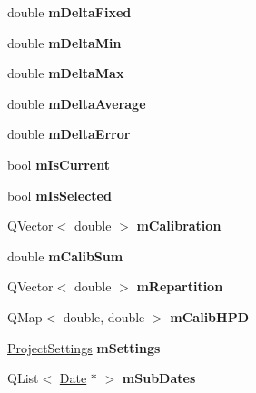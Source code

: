 \begin{DoxyCompactItemize}
\item 
\hypertarget{class_date_a99d906fa26cf5e172c82f89cafbb5d29}{double {\bfseries m\-Delta\-Fixed}}\label{class_date_a99d906fa26cf5e172c82f89cafbb5d29}

\item 
\hypertarget{class_date_a49a1e11b0c11e08d5d31c779b4e4162c}{double {\bfseries m\-Delta\-Min}}\label{class_date_a49a1e11b0c11e08d5d31c779b4e4162c}

\item 
\hypertarget{class_date_a1860b01d6c38f622045c75a5c59da380}{double {\bfseries m\-Delta\-Max}}\label{class_date_a1860b01d6c38f622045c75a5c59da380}

\item 
\hypertarget{class_date_a54304fe7c70631b1c0ab1ddedf29140c}{double {\bfseries m\-Delta\-Average}}\label{class_date_a54304fe7c70631b1c0ab1ddedf29140c}

\item 
\hypertarget{class_date_ae655564ea209648c17f53d53586874d5}{double {\bfseries m\-Delta\-Error}}\label{class_date_ae655564ea209648c17f53d53586874d5}

\item 
\hypertarget{class_date_ad8e7e873fbc2513bb2a0d194c6a81f53}{bool {\bfseries m\-Is\-Current}}\label{class_date_ad8e7e873fbc2513bb2a0d194c6a81f53}

\item 
\hypertarget{class_date_abb33769a8f026dc32afb761016731156}{bool {\bfseries m\-Is\-Selected}}\label{class_date_abb33769a8f026dc32afb761016731156}

\item 
\hypertarget{class_date_aab78b5a4ce115739349ea549d41d4e64}{Q\-Vector$<$ double $>$ {\bfseries m\-Calibration}}\label{class_date_aab78b5a4ce115739349ea549d41d4e64}

\item 
\hypertarget{class_date_a379410c8404820b4f78b1c3cfb590c57}{double {\bfseries m\-Calib\-Sum}}\label{class_date_a379410c8404820b4f78b1c3cfb590c57}

\item 
\hypertarget{class_date_a3a721128a81405055fbc41c7cfc8371f}{Q\-Vector$<$ double $>$ {\bfseries m\-Repartition}}\label{class_date_a3a721128a81405055fbc41c7cfc8371f}

\item 
\hypertarget{class_date_ad35aa6c168924fafededb2f97533c714}{Q\-Map$<$ double, double $>$ {\bfseries m\-Calib\-H\-P\-D}}\label{class_date_ad35aa6c168924fafededb2f97533c714}

\item 
\hypertarget{class_date_a32da7646da4c2e972a51d2370cea8832}{\hyperlink{class_project_settings}{Project\-Settings} {\bfseries m\-Settings}}\label{class_date_a32da7646da4c2e972a51d2370cea8832}

\item 
\hypertarget{class_date_a62ee2e82b70da0bb34a0f75156785dfe}{Q\-List$<$ \hyperlink{class_date}{Date} $\ast$ $>$ {\bfseries m\-Sub\-Dates}}\label{class_date_a62ee2e82b70da0bb34a0f75156785dfe}

\end{DoxyCompactItemize}


